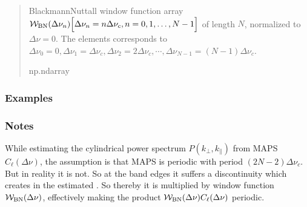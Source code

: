 \documentclass[a4paper,11pt,oneside,english,openany]{sphinxmanual}
\begin{document}
\begin{fulllineitems}
\begin{quote}
\begin{description}
\sphinxAtStartPar
{} \textendash{} Blackmann\sphinxhyphen{}Nuttall window function array \(\mathcal{W}_{\rm BN}(\Delta\nu_n)\Bigr[\Delta\nu_n = n\Delta\nu_c,\\n = 0,1,\dots,N-1\Bigl]\) of length \(N\), normalized to \(\Delta\nu = 0\). The elements corresponds to \(\Delta\nu_0 = 0,\Delta\nu_1 =\Delta\nu_c,\Delta\nu_2 =2\Delta\nu_c,\cdots,\Delta\nu_{N-1} =(N-1)\Delta\nu_c\).

\sphinxAtStartPar
np.ndarray

\end{description}\end{quote}
\subsubsection*{Examples}

\begin{sphinxVerbatim}[commandchars=\\\{\}]
     
     
     
\end{sphinxVerbatim}
\subsubsection*{Notes}

\sphinxAtStartPar
While estimating the cylindrical power spectrum \(P(k_{\perp},k_{\parallel})\) from MAPS \(C_{\ell}(\Delta\nu)\), the assumption is that MAPS is periodic with period \((2N-2)\Delta\nu_c\). But in reality it is not. So at the band edges it suffers a discontinuity which creates  in the estimated . So thereby it is multiplied by window function \(\mathcal{W}_{\rm BN}(\Delta\nu)\), effectively making the product \(\mathcal{W}_{\rm BN}(\Delta\nu)C_{\ell}(\Delta\nu)\) periodic.


\end{fulllineitems}
\end{document}
